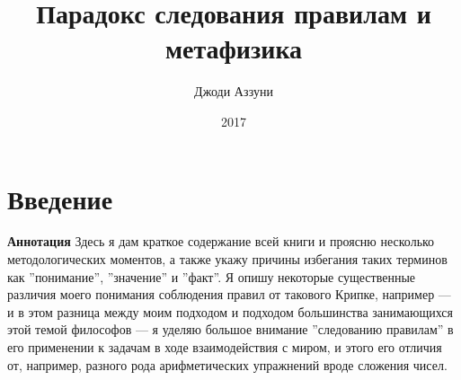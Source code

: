 \documentclass[11pt]{book}
\title{Парадокс следования правилам и метафизика}
\author{Джоди Аззуни}
\date{2017}
\begin{document}

\null
    \thispagestyle{empty}%
    \addtocounter{page}{-1}%
    \newpage

\tableofcontents

\chapter{Введение}

\qquad

\textbf{Аннотация} \quad Здесь я дам краткое содержание всей книги и проясню несколько методологических моментов, а также укажу причины избегания таких терминов как ''понимание'', ''значение'' и ''факт''. Я опишу некоторые существенные различия моего понимания соблюдения правил от такового Крипке, например --- и в этом разница между моим подходом и подходом большинства занимающихся этой темой философов --- я уделяю большое внимание ''следованию правилам'' в его применении к задачам в ходе взаимодействия с миром, и этого его отличия от, например, разного рода арифметических упражнений вроде сложения чисел.
\end{document}
